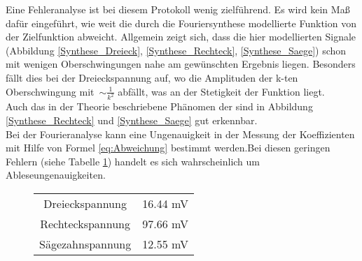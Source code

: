 Eine Fehleranalyse ist bei diesem Protokoll wenig zielführend. Es wird kein Maß dafür eingeführt, wie weit die durch die Fouriersynthese modellierte Funktion von der Zielfunktion abweicht. Allgemein zeigt sich, dass die hier modellierten Signale (Abbildung \ref{Synthese_Dreieck}, \ref{Synthese_Rechteck}, \ref{Synthese_Saege}) schon mit wenigen Oberschwingungen nahe am gewünschten Ergebnis liegen. Besonders fällt dies bei der Dreieckspannung auf, wo die Amplituden der k-ten Oberschwingung mit~$\sim \frac{1}{k^2}$ abfällt, was an der Stetigkeit der Funktion liegt. \\
Auch das in der Theorie beschriebene Phänomen der sind in Abbildung \ref{Synthese_Rechteck} und \ref{Synthese_Saege} gut erkennbar. \\
Bei der Fourieranalyse kann eine Ungenauigkeit in der Messung der Koeffizienten mit Hilfe von Formel \eqref{eq:Abweichung} bestimmt werden.Bei diesen geringen Fehlern (siehe Tabelle \ref{tab:Fehler}) handelt es sich wahrscheinlich um Ableseungenauigkeiten.
\begin{figure}[h!]
	\centering
		\begin{tabular}{cc}
			Dreieckspannung & 16.44 \si{\milli\volt} \\
			Rechteckspannung & 97.66 \si{\milli\volt} \\
			Sägezahnspannung & 12.55 \si{\milli\volt} \\
		\end{tabular}
		\label{tab:Fehler}
\end{figure}


